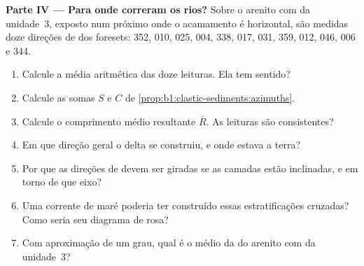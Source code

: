 \begin{problem}
\medskip
\noindent\textbf{Parte IV --- Para onde correram os rios?}
Sobre o arenito com  da unidade~3, exposto num  próximo onde o acamamento é horizontal, são medidas doze direções de  dos foresets: 352, 010, 025, 004, 338, 017, 031, 359, 012, 046, 006 e 344.
\begin{enumerate}[resume]
  \item Calcule a média aritmética das doze leituras. Ela tem sentido?
  \item Calcule as somas $S$ e $C$ de \cref{prop:b1:clastic-sediments:azimuths}.
  \item Calcule o comprimento médio resultante $\bar R$. As leituras são consistentes?
  \item Em que direção geral o delta se construiu, e onde estava a terra?
  \item Por que as direções de  devem ser giradas se as camadas estão inclinadas, e em torno de que eixo?
  \item Uma corrente de maré poderia ter construído essas estratificações cruzadas? Como seria seu diagrama de rosa?
  \item Com aproximação de um grau, qual é o  médio da  do arenito com  da unidade~3?
\end{enumerate}
\end{problem}
